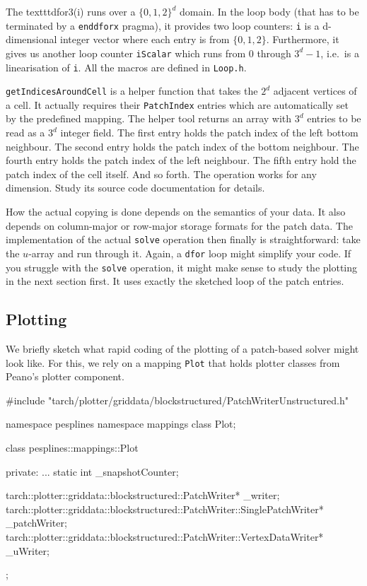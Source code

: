 \noindent
The texttt{dfor3(i)} runs over a $\{0,1,2\}^d$ domain.
In the loop body (that has to be terminated by a \texttt{enddforx} pragma), it
provides two loop counters: \texttt{i} is a d-dimensional integer vector where
each entry is from $\{0,1,2\}$.
Furthermore, it gives us another loop counter \texttt{iScalar} which runs from 0
through $3^d-1$, i.e.~is a linearisation of \texttt{i}.
All the macros are defined in \texttt{Loop.h}.


\texttt{getIndicesAroundCell} is a helper function that takes the $2^d$ adjacent
vertices of a cell.
It actually requires their \texttt{PatchIndex} entries which are automatically
set by the predefined mapping.
The helper tool returns an array with $3^d$ entries to be read as a $3^d$
integer field.
The first entry holds the patch index of the left bottom neighbour.
The second entry holds the patch index of the bottom neighbour.
The fourth entry holds the patch index of the left neighbour.
The fifth entry hold the patch index of the cell itself.
And so forth.
The operation works for any dimension.
Study its source code documentation for details.


How the actual copying is done depends on the semantics of your data. 
It also depends on column-major or row-major storage formats for the patch data.
The implementation of the actual \texttt{solve} operation then finally is
straightforward: take the $u$-array and run through it. Again, a \texttt{dfor}
loop might simplify your code.
If you struggle with the \texttt{solve} operation, it might make sense to study
the plotting in the next section first. 
It uses exactly the sketched loop of the patch entries.


\subsection{Plotting}

We briefly sketch what rapid coding of the plotting of a patch-based solver
might look like.
For this, we rely on a mapping \texttt{Plot} that holds plotter classes from 
Peano's plotter component.


\begin{code}
#include "tarch/plotter/griddata/blockstructured/PatchWriterUnstructured.h"

namespace pesplines {
  namespace mappings {
    class Plot;
  }
}

class pesplines::mappings::Plot {
  private:
    ...
    static int                  _snapshotCounter;

    tarch::plotter::griddata::blockstructured::PatchWriter*                      _writer;
    tarch::plotter::griddata::blockstructured::PatchWriter::SinglePatchWriter*   _patchWriter;
    tarch::plotter::griddata::blockstructured::PatchWriter::VertexDataWriter*    _uWriter;
};
\end{code}

